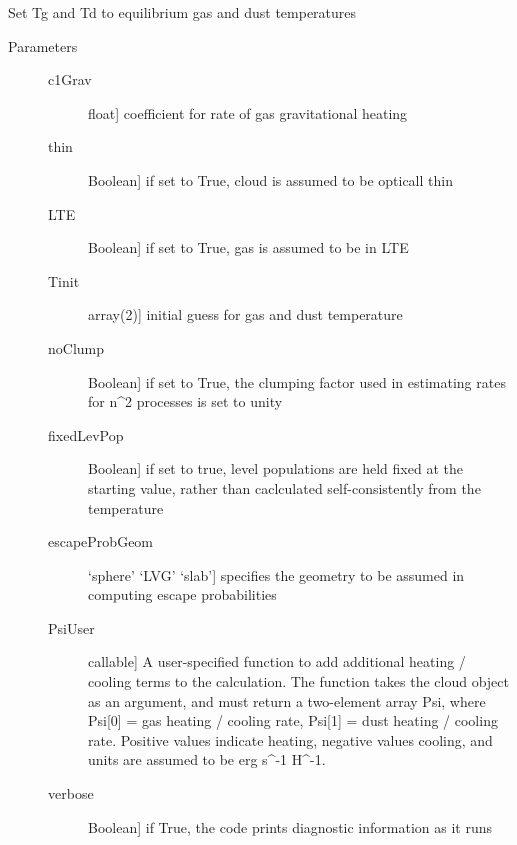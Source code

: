 \documentclass[letterpaper,10pt,english]{sphinxmanual}
\begin{document}
\begin{fulllineitems}
\begin{fulllineitems}
\label{fulldoc:despotic.cloud.setTempEq}
Set Tg and Td to equilibrium gas and dust temperatures
\begin{description}
\item[{Parameters}] \leavevmode\begin{description}
\item[{c1Grav}] \leavevmode{[}float{]}
coefficient for rate of gas gravitational heating

\item[{thin}] \leavevmode{[}Boolean{]}
if set to True, cloud is assumed to be opticall thin

\item[{LTE}] \leavevmode{[}Boolean{]}
if set to True, gas is assumed to be in LTE

\item[{Tinit}] \leavevmode{[}array(2){]}
initial guess for gas and dust temperature

\item[{noClump}] \leavevmode{[}Boolean{]}
if set to True, the clumping factor used in estimating
rates for n\textasciicircum{}2 processes is set to unity

\item[{fixedLevPop}] \leavevmode{[}Boolean{]}
if set to true, level populations are held fixed
at the starting value, rather than caclculated
self-consistently from the temperature

\item[{escapeProbGeom}] \leavevmode{[}`sphere' \textbar{} `LVG' \textbar{} `slab'{]}
specifies the geometry to be assumed in computing escape
probabilities

\item[{PsiUser}] \leavevmode{[}callable{]}
A user-specified function to add additional heating /
cooling terms to the calculation. The function takes the
cloud object as an argument, and must return a two-element
array Psi, where Psi{[}0{]} = gas heating / cooling rate,
Psi{[}1{]} = dust heating / cooling rate. Positive values
indicate heating, negative values cooling, and units are
assumed to be erg s\textasciicircum{}-1 H\textasciicircum{}-1.

\item[{verbose}] \leavevmode{[}Boolean{]}
if True, the code prints diagnostic information as it runs


\end{description}
\end{description}
\end{fulllineitems}
\end{fulllineitems}
\end{document}
